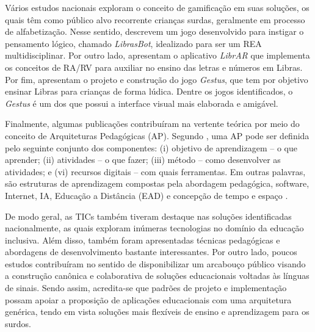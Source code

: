 Vários estudos nacionais exploram o conceito de gamificação em suas soluções, os quais têm como público alvo recorrente crianças surdas, geralmente em processo de alfabetização. Nesse sentido, \cite{BRA23} descrevem um jogo desenvolvido para instigar o pensamento lógico, chamado \textit{LibrasBot}, idealizado para ser um REA multidisciplinar. Por outro lado,  apresentam o aplicativo \textit{LibrAR} que implementa os conceitos de RA/RV para auxiliar no ensino das letras e números em Libras. Por fim,  apresentam o projeto e construção do jogo \textit{Gestus}, que tem por objetivo ensinar Libras para crianças de forma lúdica. Dentre os jogos identificados, o \textit{Gestus} é um dos que possui a interface visual mais elaborada e amigável.

Finalmente, algumas publicações contribuíram na vertente teórica por meio do conceito de Arquiteturas Pedagógicas (AP). Segundo , uma AP pode ser definida pelo seguinte conjunto dos componentes: (i) objetivo de aprendizagem -- o que aprender; (ii) atividades -- o que fazer; (iii) método -- como desenvolver as atividades; e (vi) recursos digitais -- com quais ferramentas. Em outras palavras, são estruturas de aprendizagem compostas pela abordagem pedagógica, software, Internet, IA, Educação a Distância (EAD) e concepção de tempo e espaço \cite{BRA27}.

De modo geral, as TICs também tiveram destaque nas soluções identificadas nacionalmente, as quais exploram inúmeras tecnologias no domínio da educação inclusiva. Além disso, também foram apresentadas técnicas pedagógicas e abordagens de desenvolvimento bastante interessantes. Por outro lado, poucos estudos contribuíram no sentido de disponibilizar um arcabouço público visando a construção canônica e colaborativa de soluções educacionais voltadas às línguas de sinais. Sendo assim, acredita-se que padrões de projeto e implementação possam apoiar a proposição de aplicações educacionais com uma arquitetura genérica, tendo em vista soluções mais flexíveis de ensino e aprendizagem para os surdos.




